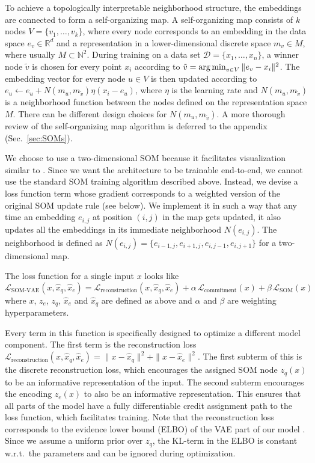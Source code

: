To achieve a topologically interpretable neighborhood structure, the embeddings are connected to form a self-organizing map.
A self-organizing map consists of $k$ nodes $V=\{v_1, \dots , v_k\}$, where every node corresponds to an embedding in the data space $e_v \in \mathbb{R}^d$ and a representation in a lower-dimensional discrete space $m_v \in M$, where usually $M \subset \mathbb{N}^2$.
During training on a data set $\mathcal{D} = \{x_1, \dots ,x_n\}$, a winner node $\tilde{v}$ is chosen for every point $x_i$ according to $\tilde{v} = \operatorname*{arg\,min}_{v \in V} \| e_v - x_i \|^2$.
The embedding vector for every node $u \in V$ is then updated according to $e_u \leftarrow e_u + N(m_u,m_{\tilde{v}}) \eta (x_i - e_u)$, where $\eta$ is the learning rate and $N(m_u, m_{\tilde{v}})$ is a neighborhood function between the nodes defined on the representation space $M$.
There can be different design choices for $N(m_u, m_{\tilde{v}})$.
A more thorough review of the self-organizing map algorithm is deferred to the appendix (Sec.~\ref{sec:SOMs}).

We choose to use a two-dimensional SOM because it facilitates visualization similar to \citet{Tirunagari2015}.
Since we want the architecture to be trainable end-to-end, we cannot use the standard SOM training algorithm described above.
Instead, we devise a loss function term whose gradient corresponds to a weighted version of the original SOM update rule (see below).
We implement it in such a way that any time an embedding $e_{i,j}$ at position $(i,j)$ in the map gets updated, it also updates all the embeddings in its immediate neighborhood $N(e_{i,j})$.
The neighborhood is defined as $N(e_{i,j}) = \{ e_{i-1,j}, e_{i+1,j}, e_{i,j-1}, e_{i,j+1} \}$ for a two-dimensional map.

The loss function for a single input $x$ looks like
%
\begin{equation} \label{eq:L_somvae}
	\mathcal{L}_{\text{SOM-VAE}}(x, \hat{x}_q, \hat{x}_e) = \mathcal{L}_{\text{reconstruction}}(x, \hat{x}_q, \hat{x}_e) + \alpha \, \mathcal{L}_{\text{commitment}}(x) + \beta \, \mathcal{L}_{\text{SOM}}(x)
\end{equation}
%
where $x$, $z_e$, $z_q$, $\hat{x}_e$ and $\hat{x}_q$ are defined as above and $\alpha$ and $\beta$ are weighting hyperparameters.

Every term in this function is specifically designed to optimize a different model component.
The first term is the reconstruction loss $\mathcal{L}_{\text{reconstruction}}(x, \hat{x}_q, \hat{x}_e) = \| x - \hat{x}_q \|^2 + \| x - \hat{x}_e \|^2$.
The first subterm of this is the discrete reconstruction loss, which encourages the assigned SOM node $z_q(x)$ to be an informative representation of the input.
The second subterm encourages the encoding $z_e(x)$ to also be an informative representation.
This ensures that all parts of the model have a fully differentiable credit assignment path to the loss function, which facilitates training.
Note that the reconstruction loss corresponds to the evidence lower bound (ELBO) of the VAE part of our model \citep{Kingma2013}.
Since we assume a uniform prior over $z_q$, the KL-term in the ELBO is constant w.r.t.\ the parameters and can be ignored during optimization.

